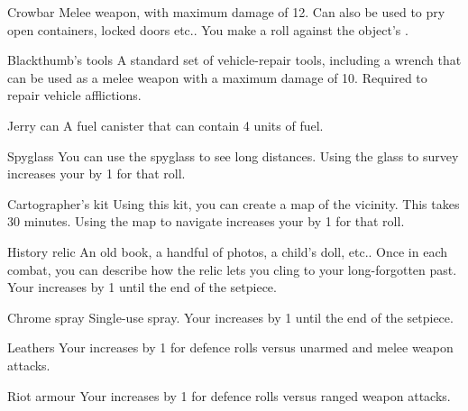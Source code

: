 \hr

\begin{describe}{Crowbar}
  Melee weapon, with maximum damage of 12. Can also be used to pry open containers, locked doors etc.. You make a  roll against the object's .
\end{describe}

\begin{describe}{Blackthumb's tools}
  A standard set of vehicle-repair tools, including a wrench that can be used as a melee weapon with a maximum damage of 10. Required to repair vehicle afflictions.
\end{describe}

\begin{describe}{Jerry can}
  A fuel canister that can contain 4 units of fuel.
\end{describe}

\begin{describe}{Spyglass}
  You can use the spyglass to see long distances. Using the glass to survey increases your  by 1 for that roll.
\end{describe}

\begin{describe}{Cartographer's kit}
  Using this kit, you can create a map of the vicinity. This takes 30 minutes. Using the map to navigate increases your  by 1 for that roll.
\end{describe}

\begin{describe}{History relic}
  An old book, a handful of photos, a child's doll, etc.. Once in each combat, you can describe how the relic lets you cling to your long-forgotten past. Your  increases by 1 until the end of the setpiece.
\end{describe}

\begin{describe}{Chrome spray}
  Single-use spray. Your  increases by 1 until the end of the setpiece.
\end{describe}

\hr

\begin{describe}{Leathers}
  Your  increases by 1 for defence rolls versus unarmed and melee weapon attacks.
\end{describe}

\begin{describe}{Riot armour}
  Your  increases by 1 for defence rolls versus ranged weapon attacks.
\end{describe}
